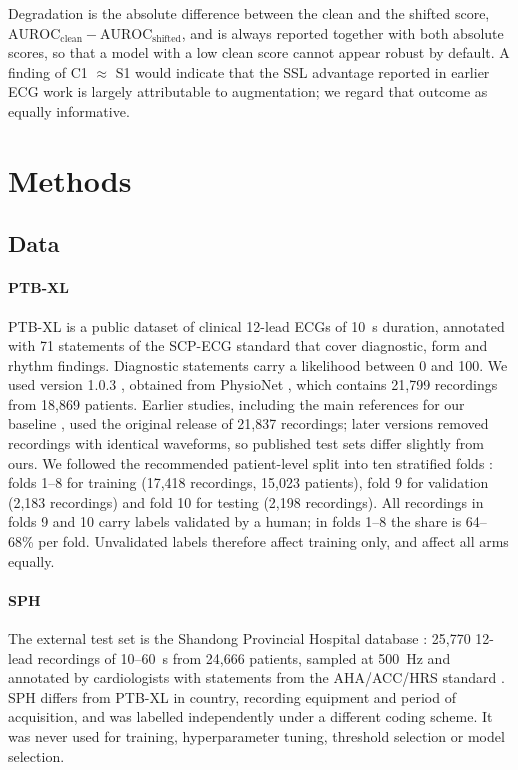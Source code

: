 \documentclass[preprint,12pt]{elsarticle}
\begin{document}
Degradation is the absolute difference between the clean and the shifted score, $\mathrm{AUROC}_{\text{clean}} - \mathrm{AUROC}_{\text{shifted}}$, and is always reported together with both absolute scores, so that a model with a low clean score cannot appear robust by default. A finding of C1 $\approx$ S1 would indicate that the SSL advantage reported in earlier ECG work is largely attributable to augmentation; we regard that outcome as equally informative.

\section{Methods}
\label{sec:methods}

\subsection{Data}
\label{sec:data}

\paragraph{PTB-XL} PTB-XL \cite{wagner2020} is a public dataset of clinical 12-lead ECGs of 10~s duration, annotated with 71 statements of the SCP-ECG standard that cover diagnostic, form and rhythm findings. Diagnostic statements carry a likelihood between 0 and 100. We used version 1.0.3 \cite{wagner2022physionet}, obtained from PhysioNet \cite{goldberger2000}, which contains 21,799 recordings from 18,869 patients. Earlier studies, including the main references for our baseline \cite{strodthoff2021,mehari2022}, used the original release of 21,837 recordings; later versions removed recordings with identical waveforms, so published test sets differ slightly from ours. We followed the recommended patient-level split into ten stratified folds \cite{wagner2020}: folds 1--8 for training (17,418 recordings, 15,023 patients), fold 9 for validation (2,183 recordings) and fold 10 for testing (2,198 recordings). All recordings in folds 9 and 10 carry labels validated by a human; in folds 1--8 the share is 64--68\% per fold. Unvalidated labels therefore affect training only, and affect all arms equally.

\paragraph{SPH} The external test set is the Shandong Provincial Hospital database \cite{liu2022sph}: 25,770 12-lead recordings of 10--60~s from 24,666 patients, sampled at 500~Hz and annotated by cardiologists with statements from the AHA/ACC/HRS standard \cite{mason2007}. SPH differs from PTB-XL in country, recording equipment and period of acquisition, and was labelled independently under a different coding scheme. It was never used for training, hyperparameter tuning, threshold selection or model selection.
\end{document}
